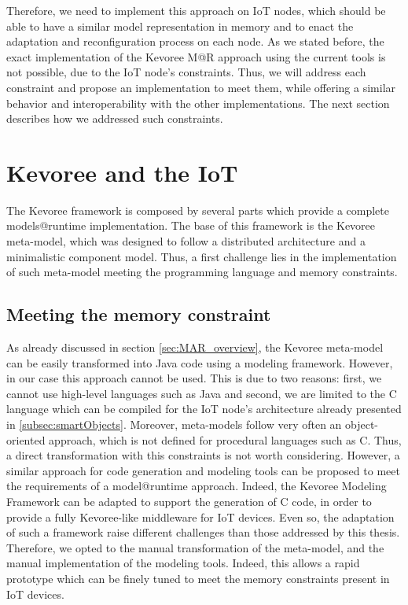 Therefore, we need to implement this approach on IoT nodes, which should be able to have a similar model representation in memory and to enact the adaptation and reconfiguration process on each node.
As we stated before, the exact implementation of the Kevoree M@R approach using the current tools is not possible, due to the IoT node's constraints.
Thus, we will address each constraint and propose an implementation to meet them, while offering a similar behavior and interoperability with the other implementations.
The next section describes how we addressed such constraints.

\section{Kevoree and the IoT}
The Kevoree framework is composed by several parts which provide a complete models@runtime implementation.
The base of this framework is the Kevoree meta-model, which was designed to follow a distributed architecture and a minimalistic component model.
Thus, a first challenge lies in the implementation of such meta-model meeting the programming language and memory constraints.

\subsection{Meeting the memory constraint}
As already discussed in section \ref{sec:MAR_overview}, the Kevoree meta-model can be easily transformed into Java code using a modeling framework.
However, in our case this approach cannot be used.
This is due to two reasons: first, we cannot use high-level languages such as Java and second, we are limited to the C language which can be compiled for the IoT node's architecture already presented in \ref{subsec:smartObjects}.
Moreover, meta-models follow very often an object-oriented approach, which is not defined for procedural languages such as C.
Thus, a direct transformation with this constraints is not worth considering.
However, a similar approach for code generation and modeling tools can be proposed to meet the requirements of a model@runtime approach.
Indeed, the Kevoree Modeling Framework\cite{fouquet2012eclipse} can be adapted to support the generation of C code, in order to provide a fully Kevoree-like middleware for IoT devices.
Even so, the adaptation of such a framework raise different challenges than those addressed by this thesis.
Therefore, we opted to the manual transformation of the meta-model, and the manual implementation of the modeling tools.
Indeed, this allows a rapid prototype which can be finely tuned to meet the memory constraints present in IoT devices.

